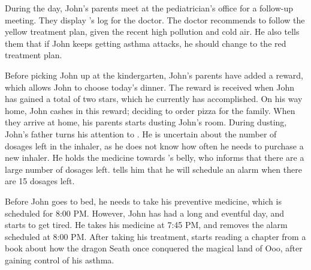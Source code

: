 During the day, John's parents meet at the pediatrician's office for a follow-up meeting. They display \app{}'s log for the doctor. The doctor recommends to follow the yellow treatment plan, given the recent high pollution and cold air. He also tells them that if John keeps getting asthma attacks, he should change to the red treatment plan.

Before picking John up at the kindergarten, John's parents have added a reward, which allows John to choose today's dinner. The reward is received when John has gained a total of two stars, which he currently has accomplished. On his way home, John cashes in this reward; deciding to order pizza for the family. When they arrive at home, his parents starts dusting John's room. During dusting, John's father turns his attention to \buddy{}. He is uncertain about the number of dosages left in the inhaler, as he does not know how often he needs to purchase a new inhaler. He holds the medicine towards \buddy{}'s belly, who informs that there are a large number of dosages left. \buddy{} tells him that he will schedule an alarm when there are 15 dosages left. 

Before John goes to bed, he needs to take his preventive medicine, which is scheduled for 8:00 PM. However, John has had a long and eventful day, and starts to get tired. He takes his medicine at 7:45 PM, and \buddy{} removes the alarm scheduled at 8:00 PM. After taking his treatment, \buddy{} starts reading a chapter from a book about how the dragon Seath once conquered the magical land of Ooo, after gaining control of his asthma. 